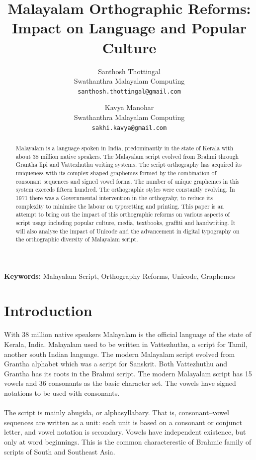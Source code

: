 \documentclass[10pt]{article}
\title{Malayalam Orthographic Reforms: \\Impact on Language and Popular Culture}
\author{Santhosh Thottingal \\
 Swathanthra Malayalam Computing \\
 {\small {\tt santhosh.thottingal@gmail.com}} \\
 \and
 Kavya Manohar \\
 Swathanthra Malayalam Computing \\
 {\small {\tt sakhi.kavya@gmail.com}}}
\date{}
\begin{document}
\maketitle

\begin{abstract}

Malayalam is a language spoken in India, predominantly in the state of Kerala with about 38 million native speakers. The Malayalam script evolved from Brahmi through Grantha lipi and Vattezhuthu writing systems. The script orthography has acquired its uniqueness with its complex shaped graphemes formed by the combination of consonant sequences and  signed vowel forms. The number of unique graphemes in this system exceeds fifteen hundred. The orthographic styles were constantly evolving. In 1971 there was a Governmental intervention in the orthograhy, to reduce its complexity to minimise the labour on typesetting and printing. This paper is an attempt to bring out the impact of this orthographic reforms on various aspects of script usage including popular culture, media, textbooks, graffiti and handwriting. It will also analyse the impact of Unicode and the advancement in digital typography on the orthographic diversity of Malayalam script.

\end{abstract}
 \textbf{Keywords:} Malayalam Script, Orthography Reforms, Unicode, Graphemes

\section{Introduction}

\paragraph{}

With 38 million native speakers Malayalam is the official language of the state of Kerala, India.  Malayalam used to be written in Vattezhuthu, a script for Tamil, another south Indian language. The modern Malayalam script evolved from Grantha alphabet which was a script for Sanskrit. Both Vattezhuthu and Grantha has its roots in the Brahmi script\cite{}. The modern Malayalam script has 15 vowels and 36 consonants as the basic character set. The vowels have signed notations to be used with consonants.

\paragraph{}
The script is mainly abugida, or alphasyllabary. That is, consonant–vowel sequences are written as a unit: each unit is based on a consonant or conjunct letter, and vowel notation is secondary. Vowels have independent existence, but only at word beginnings. This is the common characterestic of  Brahmic family of scripts of South and Southeast Asia\cite{}.
\end{document}
